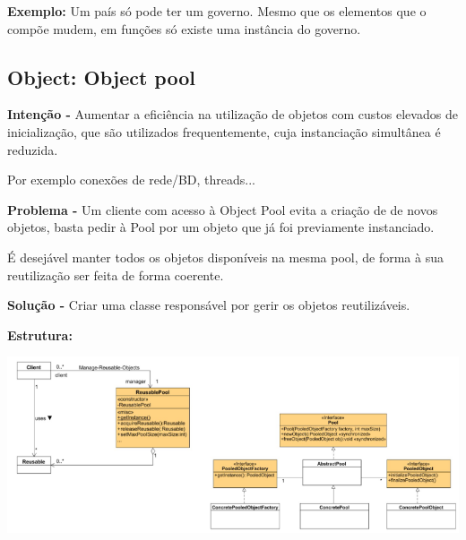 \documentclass{article}
\begin{document}
\begin{flushleft}
    \textbf{Exemplo:} Um país só pode ter um governo. Mesmo que os elementos que o compõe mudem, em funções só existe
    uma instância do governo.
\end{flushleft}

\pagebreak

\subsection{Object: Object pool}

\begin{flushleft}
    \textbf{Intenção -} Aumentar a eficiência na utilização de objetos com custos elevados de inicialização,
    que são utilizados frequentemente, cuja instanciação simultânea é reduzida.

    Por exemplo conexões de rede/BD, threads...
\end{flushleft}

\begin{flushleft}
    \textbf{Problema -} Um cliente com acesso à Object Pool evita a criação de de novos objetos, basta pedir
    à Pool por um objeto que já foi previamente instanciado.
    
    É desejável manter todos os objetos disponíveis na mesma pool, de forma à sua
    reutilização ser feita de forma coerente.

\end{flushleft}

\begin{flushleft}
    \textbf{Solução -} Criar uma classe responsável por gerir os objetos reutilizáveis.
\end{flushleft}

\begin{flushleft}
    \textbf{Estrutura:}

    \begin{center}
        \includegraphics[scale=0.5]{Images/35.png}
    \end{center}

\end{flushleft}
\end{document}
